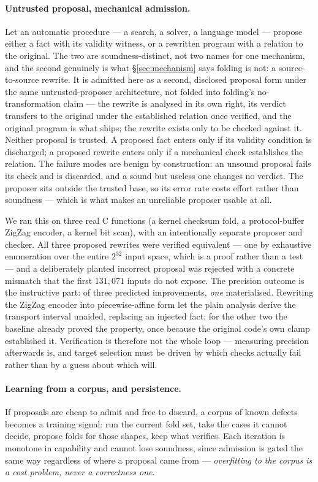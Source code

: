 \documentclass[11pt,a4paper]{article}
\begin{document}
\paragraph{Untrusted proposal, mechanical admission.} Let an automatic
procedure --- a search, a solver, a language model --- propose either a fact with its
validity witness, or a rewritten program with a relation to the original. The two are
soundness-distinct, not two names for one mechanism, and the second genuinely is what
\S\ref{sec:mechanism} says folding is not: a source-to-source rewrite. It is admitted
here as a second, disclosed proposal form under the same untrusted-proposer architecture,
not folded into folding's no-transformation claim --- the rewrite is analysed in its own
right, its verdict transfers to the original under the established relation once
verified, and the original program is what ships; the rewrite exists only to be checked
against it. Neither proposal is trusted. A proposed fact enters only if its validity
condition is discharged; a proposed rewrite enters only if a mechanical check establishes
the relation. The failure modes are
benign by construction: an unsound proposal fails its check and is discarded, and a sound
but useless one changes no verdict. The proposer sits outside the trusted base, so its
error rate costs effort rather than soundness --- which is what makes an unreliable
proposer usable at all.

We ran this on three real C functions (a kernel checksum fold, a protocol-buffer ZigZag
encoder, a kernel bit scan), with an intentionally separate proposer and checker. All
three proposed rewrites were verified equivalent --- one by exhaustive enumeration over
the entire $2^{32}$ input space, which is a proof rather than a test --- and a
deliberately planted incorrect proposal was rejected with a concrete mismatch that the
first $131{,}071$ inputs do not expose. The precision outcome is the instructive part:
of three predicted improvements, \emph{one} materialised. Rewriting the ZigZag encoder
into piecewise-affine form let the plain analysis derive the transport interval unaided,
replacing an injected fact; for the other two the baseline already proved the property,
once because the original code's own clamp established it. Verification is therefore not
the whole loop --- measuring precision afterwards is, and target selection must be driven
by which checks actually fail rather than by a guess about which will.

\paragraph{Learning from a corpus, and persistence.} If proposals are cheap to admit and
free to discard, a corpus of known defects becomes a training signal: run the current fold
set, take the cases it cannot decide, propose folds for those shapes, keep what verifies.
Each iteration is monotone in capability and cannot lose soundness, since admission is
gated the same way regardless of where a proposal came from --- \emph{overfitting to the
corpus is a cost problem, never a correctness one}.
\end{document}
